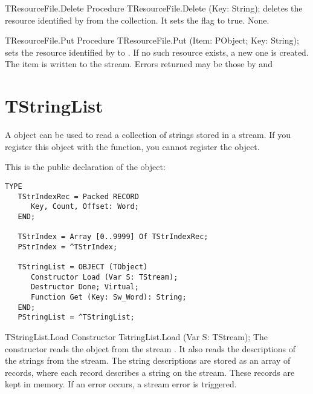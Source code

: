 \begin{procedure}{TResourceFile.Delete}
\Declaration
Procedure TResourceFile.Delete (Key: String);
\Description
{} deletes the resource identified by  from the
collection. It sets the  flag to true.
\Errors
None.
\SeeAlso
{}
\end{procedure}

\begin{procedure}{TResourceFile.Put}
\Declaration
Procedure TResourceFile.Put (Item: PObject; Key: String);
\Description
{} sets the resource identified by  to .
If no such resource exists, a new one is created. The item is written
to the stream.
\Errors
Errors returned may be those by  and 
\SeeAlso
{}
\end{procedure}

\section{TStringList}
\label{se:TStringList}

A  object can be used to read a collection of strings
stored in a stream. If you register this object with the 
function, you cannot register the  object.

This is the public declaration of the  object:
\begin{verbatim}
TYPE
   TStrIndexRec = Packed RECORD
      Key, Count, Offset: Word;
   END;

   TStrIndex = Array [0..9999] Of TStrIndexRec;
   PStrIndex = ^TStrIndex;

   TStringList = OBJECT (TObject)
      Constructor Load (Var S: TStream);
      Destructor Done; Virtual;
      Function Get (Key: Sw_Word): String;
   END;
   PStringList = ^TStringList;
\end{verbatim}

\begin{procedure}{TStringList.Load}
\Declaration
Constructor TstringList.Load (Var S: TStream);
\Description
The  constructor reads the  object from the
stream . It also reads the descriptions of the strings from the
stream. The string descriptions are stored as an array of 
 records, where each record describes a string on the
stream. These records are kept in memory.
\Errors
If an error occurs, a stream error is triggered.
\SeeAlso
{}
\end{procedure}

